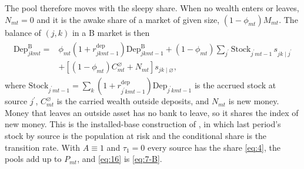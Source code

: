 The pool therefore moves with the sleepy share. When no wealth enters or leaves, $N_{mt} = 0$ and it is the awake share of a market of given size, $\left(1 - \phi_{mt}\right)M_{mt}$. %
The balance of $(j,k)$ in a $\mathrm{B}$ market is then %
\begin{gather}
	\begin{aligned}
		\mathrm{Dep}_{jkmt}^{\mathrm{B}} = {} & \phi_{mt}\left(1 + r_{jkmt-1}^{\mathrm{dep}}\right)\mathrm{Dep}_{jkmt-1}^{\mathrm{B}} + \left(1 - \phi_{mt}\right)\sum_{j^\prime}{\mathrm{Stock}_{j^\prime mt-1}\,s_{jk\mid j^\prime}} \\
		& + \left[\left(1 - \phi_{mt}\right)C^{\varnothing}_{mt} + N_{mt}\right]s_{jk\mid\varnothing},
	\end{aligned} \label{eq:16}
\end{gather}
where $\mathrm{Stock}_{j^\prime mt-1} = \sum_{k}{\left(1+r_{j^\prime kmt-1}^{\mathrm{dep}}\right)\mathrm{Dep}_{j^\prime kmt-1}}$ is the accrued stock at source $j^\prime$, $C^{\varnothing}_{mt}$ is the carried wealth outside deposits, and $N_{mt}$ is new money. Money that leaves an outside asset has no bank to leave, so it shares the index of new money. This is the installed-base construction of \textcite{nosal2012estimating,shcherbakov2016measuring}, in which last period's stock by source is the population at risk and the conditional share is the transition rate. With $A \equiv 1$ and $\tau_1 = 0$ every source has the share \eqref{eq:4}, the pools add up to $P_{mt}$, and \eqref{eq:16} is \eqref{eq:7-B}. %
